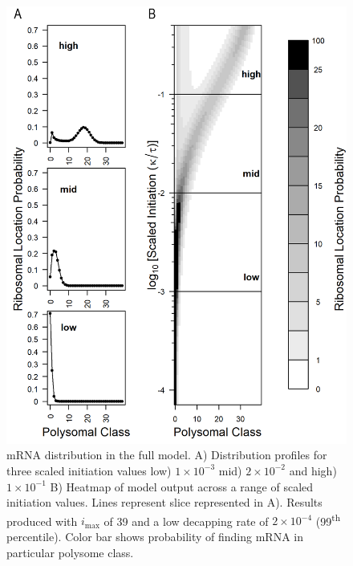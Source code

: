 \documentclass[review]{elsarticle}
\newcommand{\imax}{\ensuremath{{i_{\max}}}\xspace}
\begin{document}
\begin{figure}[!ht]
\centering
\includegraphics[width=120mm]{Images/2023-07-09_Figure1_DIIvsDDI_medianlength_low_marking_with_labels.png}
\caption{mRNA distribution in the full model. A) Distribution profiles for three scaled initiation values low) $1\times 10^{-3}$ mid) $2\times 10^{-2}$ and high) $1\times 10^{-1}$ B) Heatmap of model output across a range of scaled initiation values. Lines represent slice represented in A). Results produced with \imax of 39 and a low decapping rate of $2\times10^{-4}$  (99\textsuperscript{th} percentile). Color bar shows probability of finding mRNA in particular polysome class.}
\end{figure}
\clearpage
\end{document}
